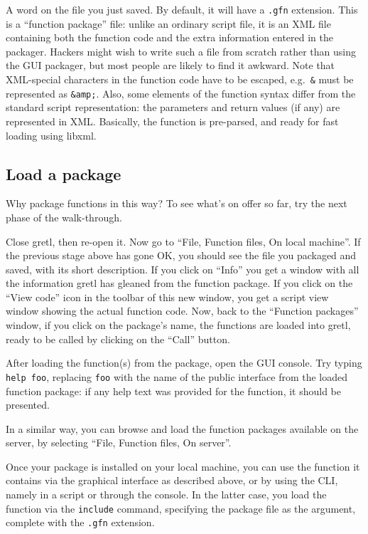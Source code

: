 \vspace{6pt}

A word on the file you just saved.  By default, it will have a
\texttt{.gfn} extension.  This is a ``function package'' file: unlike
an ordinary  script file, it is an XML file containing both
the function code and the extra information entered in the packager.
Hackers might wish to write such a file from scratch rather than using
the GUI packager, but most people are likely to find it awkward.  Note
that XML-special characters in the function code have to be escaped,
e.g.\ \texttt{\&} must be represented as \texttt{\&amp;}.  Also, some
elements of the function syntax differ from the standard script
representation: the parameters and return values (if any) are
represented in XML.  Basically, the function is pre-parsed, and ready
for fast loading using \textsf{libxml}.

\vspace{6pt}

\subsection{Load a package}

Why package functions in this way?  To see what's on offer so far, try
the next phase of the walk-through.

Close gretl, then re-open it.  Now go to ``File, Function files, On
local machine''. If the previous stage above has gone OK, you should
see the file you packaged and saved, with its short description.  If
you click on ``Info'' you get a window with all the information gretl
has gleaned from the function package.  If you click on the ``View
code'' icon in the toolbar of this new window, you get a script view
window showing the actual function code. Now, back to the ``Function
packages'' window, if you click on the package's name, the functions
are loaded into gretl, ready to be called by clicking on the ``Call''
button.

After loading the function(s) from the package, open the GUI console.
Try typing \texttt{help foo}, replacing \texttt{foo} with the name of
the public interface from the loaded function package: if any help text
was provided for the function, it should be presented.

In a similar way, you can browse and load the function packages
available on the  server, by selecting ``File, Function
files, On server''.

Once your package is installed on your local machine, you can use the
function it contains via the graphical interface as described above,
or by using the CLI, namely in a script or through the console. In the
latter case, you load the function via the \texttt{include} command,
specifying the package file as the argument, complete with the
\texttt{.gfn} extension.

